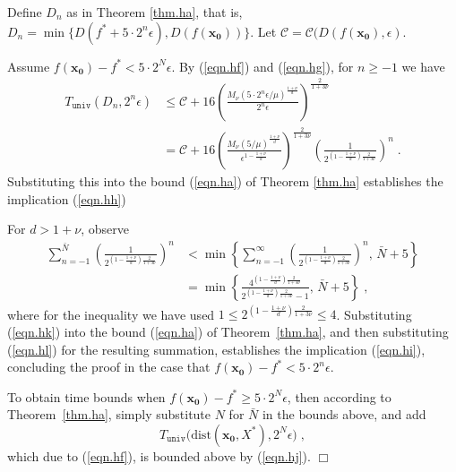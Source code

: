 \documentclass[reqno, 11pt]{amsart}
\numberwithin{equation}{section}
\newcommand{\univ}{\mathtt{univ}}
\newcommand{\dist}{\mathrm{dist}}
\begin{document}
  Define $ D_n $ as in Theorem \ref{thm.ha}, that is, $ D_n = \min \{ D(f^* + 5 \cdot 2^n \epsilon), D( f( \mathbf{x_0})) \} $.  Let $ {\mathcal C} =  {\mathcal C}  ( D(f(\mathbf{x_0}), \epsilon) $. 
 
 Assume $ f( \mathbf{x_0}) - f^* < 5 \cdot 2^N \epsilon $.   By (\ref{eqn.hf})  and (\ref{eqn.hg}),  for $ n \geq -1 $ we have
\begin{align}
  T_{\univ}(D_n, 2^n \epsilon) & \leq {\mathcal C}  +  16 \left( \frac{M_{\nu} (5 \cdot 2^n \epsilon / \mu)^{\frac{1 + \nu}{d}}}{2^n \epsilon} \right)^{\frac{2}{1 + 3 \nu}} \nonumber \\
  & = {\mathcal C}  +  16 \left( \frac{M_{\nu} (5  / \mu)^{\frac{1 + \nu}{d}}}{\epsilon^{1 - \frac{1 + \nu}{d}}}\right)^{\frac{2}{1 + 3 \nu}} \left( \frac{1}{2^{(1 - \frac{1 + \nu}{d})\frac{2}{1 + 3 \nu} }} \right)^n  \; .  \label{eqn.hk} 
 \end{align}
Substituting this into the bound (\ref{eqn.ha})  of Theorem \ref{thm.ha}  establishes the implication (\ref{eqn.hh}) 

For $ d > 1 + \nu $, observe
\begin{align}    
   \sum_{n=-1}^{\bar{N}} \left( \frac{1}{2^{(1 - \frac{1 + \nu}{d})\frac{2}{1 + 3 \nu} }} \right)^n & < \min \left\{ \sum_{n=-1}^{\infty } \left( \frac{1}{2^{(1 - \frac{1 + \nu}{d})\frac{2}{1 + 3 \nu} }} \right)^n, \, \bar{N} + 5 \right\} \nonumber \\
 & = 
   \min \left\{ \frac{4^{(1 - \frac{1 + \nu}{d}) \frac{2}{1 + 3 \nu}}}{2^{(1 - \frac{1 + \nu}{d})\frac{2}{1 + 3 \nu} } - 1}, \, \bar{N} + 5 \right\}
            \; , \label{eqn.hl} 
\end{align}
where for the inequality we have used $ 1 \leq 2^{(1 - \frac{1 + \nu}{d})\frac{2}{1 + 3 \nu} } \leq 4 $.
Substituting (\ref{eqn.hk}) into the bound (\ref{eqn.ha}) of Theorem~\ref{thm.ha}, and then substituting (\ref{eqn.hl}) for the resulting summation, establishes the implication (\ref{eqn.hi}), concluding the proof in the case that $ f( \mathbf{x_0}) - f^* < 5 \cdot 2^n \epsilon $. 

To obtain time bounds when $   f( \mathbf{x_0}) - f^* \geq  5 \cdot 2^{N} \epsilon $, then according to Theorem~\ref{thm.ha}, simply substitute $ N $ for $ \bar{N} $ in the bounds above, and add 
\[  
  T_{\univ}\big( \dist( \mathbf{x_0}, X^*), 2^N \epsilon \big) \; , \]
which due to (\ref{eqn.hf}), is bounded above by (\ref{eqn.hj}). \hfill $ \Box $
\vspace{2mm}
\end{document}
